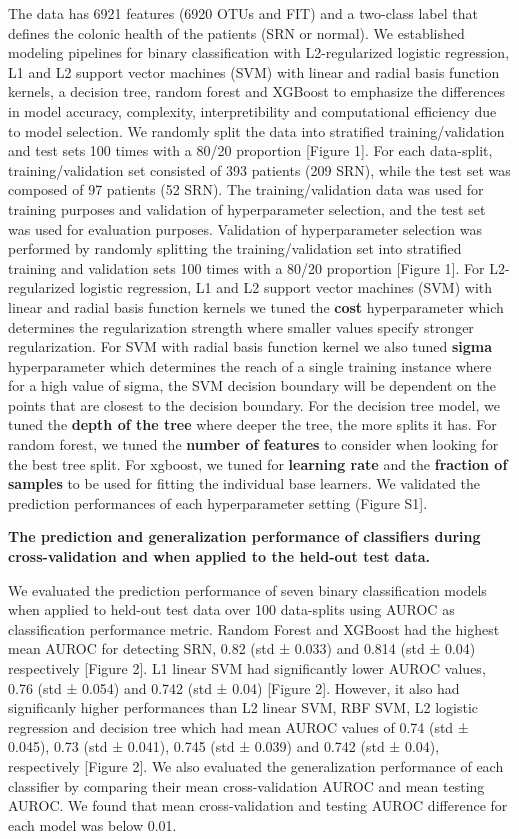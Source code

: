 \documentclass[11pt,]{article}
\begin{document}
The data has 6921 features (6920 OTUs and FIT) and a two-class label
that defines the colonic health of the patients (SRN or normal). We
established modeling pipelines for binary classification with
L2-regularized logistic regression, L1 and L2 support vector machines
(SVM) with linear and radial basis function kernels, a decision tree,
random forest and XGBoost to emphasize the differences in model
accuracy, complexity, interpretibility and computational efficiency due
to model selection. We randomly split the data into stratified
training/validation and test sets 100 times with a 80/20 proportion
{[}Figure 1{]}. For each data-split, training/validation set consisted
of 393 patients (209 SRN), while the test set was composed of 97
patients (52 SRN). The training/validation data was used for training
purposes and validation of hyperparameter selection, and the test set
was used for evaluation purposes. Validation of hyperparameter selection
was performed by randomly splitting the training/validation set into
stratified training and validation sets 100 times with a 80/20
proportion {[}Figure 1{]}. For L2-regularized logistic regression, L1
and L2 support vector machines (SVM) with linear and radial basis
function kernels we tuned the \textbf{cost} hyperparameter which
determines the regularization strength where smaller values specify
stronger regularization. For SVM with radial basis function kernel we
also tuned \textbf{sigma} hyperparameter which determines the reach of a
single training instance where for a high value of sigma, the SVM
decision boundary will be dependent on the points that are closest to
the decision boundary. For the decision tree model, we tuned the
\textbf{depth of the tree} where deeper the tree, the more splits it
has. For random forest, we tuned the \textbf{number of features} to
consider when looking for the best tree split. For xgboost, we tuned for
\textbf{learning rate} and the \textbf{fraction of samples} to be used
for fitting the individual base learners. We validated the prediction
performances of each hyperparameter setting (Figure S1{]}.

\textbf{The prediction and generalization performance of classifiers
during cross-validation and when applied to the held-out test data.}

We evaluated the prediction performance of seven binary classification
models when applied to held-out test data over 100 data-splits using
AUROC as classification performance metric. Random Forest and XGBoost
had the highest mean AUROC for detecting SRN, 0.82 (std ± 0.033) and
0.814 (std ± 0.04) respectively {[}Figure 2{]}. L1 linear SVM had
significantly lower AUROC values, 0.76 (std ± 0.054) and 0.742 (std ±
0.04) {[}Figure 2{]}. However, it also had significanly higher
performances than L2 linear SVM, RBF SVM, L2 logistic regression and
decision tree which had mean AUROC values of 0.74 (std ± 0.045), 0.73
(std ± 0.041), 0.745 (std ± 0.039) and 0.742 (std ± 0.04), respectively
{[}Figure 2{]}. We also evaluated the generalization performance of each
classifier by comparing their mean cross-validation AUROC and mean
testing AUROC. We found that mean cross-validation and testing AUROC
difference for each model was below 0.01.
\end{document}
